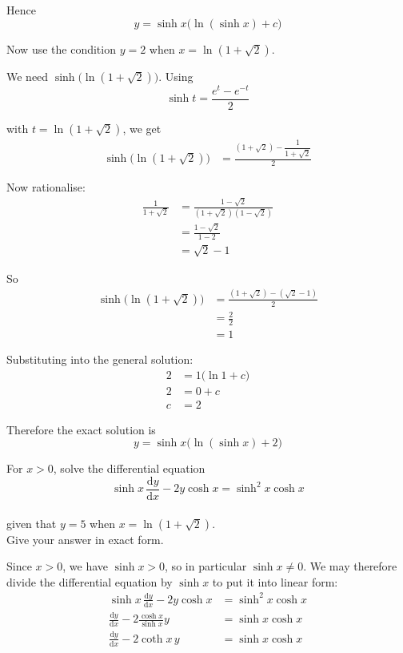 \documentclass[leqno]{article}
\begin{document}
\begin{enumerate}[
  label=\textbf{\arabic*.},
  leftmargin=*,
  topsep=0pt,
  partopsep=0pt,
  parsep=0pt
]
\begin{djsSolution}
Hence
\[
y=\sinh x\bigl(\ln(\sinh x)+c\bigr)
\]

Now use the condition $y=2$ when $x=\ln(1+\sqrt{2})$.

We need $\sinh\bigl(\ln(1+\sqrt{2})\bigr)$. Using
\[
\sinh t=\frac{e^t-e^{-t}}{2}
\]

with $t=\ln(1+\sqrt{2})$, we get
\begin{align*}
\sinh\bigl(\ln(1+\sqrt{2})\bigr)
&= \frac{(1+\sqrt{2})-\dfrac{1}{1+\sqrt{2}}}{2}
\end{align*}

Now rationalise:
\begin{align*}
\frac{1}{1+\sqrt{2}}
&= \frac{1-\sqrt{2}}{(1+\sqrt{2})(1-\sqrt{2})} \\
&= \frac{1-\sqrt{2}}{1-2} \\
&= \sqrt{2}-1
\end{align*}

So
\begin{align*}
\sinh\bigl(\ln(1+\sqrt{2})\bigr)
&= \frac{(1+\sqrt{2})-(\sqrt{2}-1)}{2} \\
&= \frac{2}{2} \\
&= 1
\end{align*}

Substituting into the general solution:
\begin{align*}
2 &= 1\bigl(\ln 1 + c\bigr) \\
2 &= 0 + c \\
c &= 2
\end{align*}

Therefore the exact solution is
\[
y=\sinh x\bigl(\ln(\sinh x)+2\bigr)
\]
\end{djsSolution}


\newpage

\questionitem

For $x>0$, solve the differential equation\\
\[
\sinh x\,\frac{\mathrm{d}y}{\mathrm{d}x} - 2y\cosh x = \sinh^2 x\cosh x
\] \\
given that $y=5$ when $x=\ln(1+\sqrt{2})$. \\
Give your answer in exact form. 

\vspace*{10pt}

\begin{djsSolution}
Since $x>0$, we have $\sinh x>0$, so in particular $\sinh x \neq 0$. We may therefore divide the differential equation by $\sinh x$ to put it into linear form:
\begin{align*}
\sinh x\,\frac{\mathrm{d}y}{\mathrm{d}x} - 2y\cosh x &= \sinh^2 x\cosh x \\
\frac{\mathrm{d}y}{\mathrm{d}x} - 2\frac{\cosh x}{\sinh x}y &= \sinh x\cosh x \\
\frac{\mathrm{d}y}{\mathrm{d}x} - 2\coth x\,y &= \sinh x\cosh x
\end{align*}


\end{djsSolution}
\end{enumerate}
\end{document}
